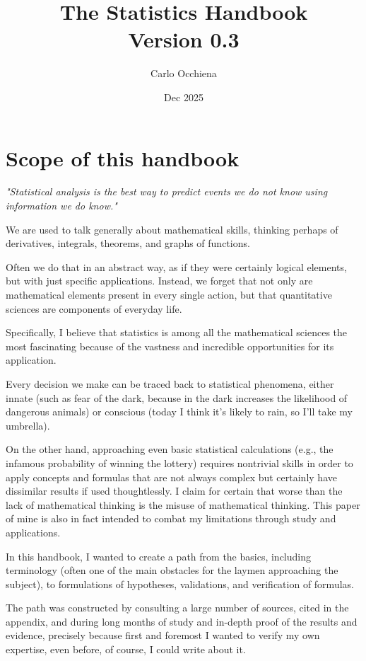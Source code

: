 \documentclass{article}
\title{The Statistics Handbook \\ 
    \normalsize Version 0.3}
\author{ Carlo Occhiena }
\date{ Dec 2025 }
\begin{document}
\fancyhead{}
\setlength{\headheight}{13.6pt}
\pagestyle{fancy}
\rhead[]{\rightmark} %

\maketitle
\tableofcontents
\clearpage

\section{Scope of this handbook}
\emph{"Statistical analysis is the best way to predict events we do not know using information we do know."} 


We are used to talk generally about mathematical skills, thinking perhaps of derivatives, integrals, theorems, and graphs of functions. 

Often we do that in an abstract way, as if they were certainly logical elements, but with just specific applications. Instead, we forget that not only are mathematical elements present in every single action, but that quantitative sciences are components of everyday life.

Specifically, I believe that statistics is among all the mathematical sciences the most fascinating because of the vastness and incredible opportunities for its application. 

Every decision we make can be traced back to statistical phenomena, either innate (such as fear of the dark, because in the dark increases the likelihood of dangerous animals) or conscious (today I think it's likely to rain, so I'll take my umbrella). 

On the other hand, approaching even basic statistical calculations (e.g., the infamous probability of winning the lottery) requires nontrivial skills in order to apply concepts and formulas that are not always complex but certainly have dissimilar results if used thoughtlessly. I claim for certain that worse than the lack of mathematical thinking is the misuse of mathematical thinking. This paper of mine is also in fact intended to combat my limitations through study and applications. 

In this handbook, I wanted to create a path from the basics, including terminology (often one of the main obstacles for the laymen approaching the subject), to formulations of hypotheses, validations, and verification of formulas.

The path was constructed by consulting a large number of sources, cited in the appendix, and during long months of study and in-depth proof of the results and evidence, precisely because first and foremost I wanted to verify my own expertise, even before, of course, I could write about it. 
\end{document}
